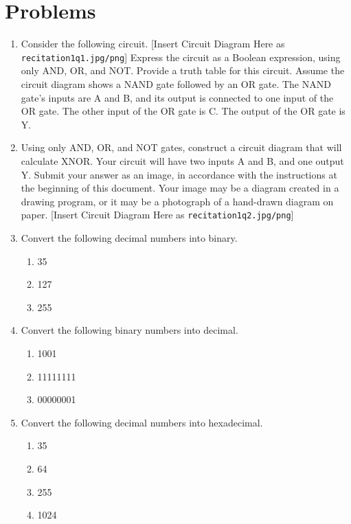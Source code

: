 \documentclass{article}
\begin{document}
\section*{Problems}
\begin{enumerate}
    \item Consider the following circuit.  [Insert Circuit Diagram Here as \texttt{recitation1q1.jpg/png}] Express the circuit as a Boolean expression, using only AND, OR, and NOT. Provide a truth table for this circuit.  Assume the circuit diagram shows a NAND gate followed by an OR gate. The NAND gate's inputs are A and B, and its output is connected to one input of the OR gate. The other input of the OR gate is C. The output of the OR gate is Y.

    \item Using only AND, OR, and NOT gates, construct a circuit diagram that will calculate XNOR. Your circuit will have two inputs A and B, and one output Y. Submit your answer as an image, in accordance with the instructions at the beginning of this document. Your image may be a diagram created in a drawing program, or it may be a photograph of a hand-drawn diagram on paper. [Insert Circuit Diagram Here as \texttt{recitation1q2.jpg/png}]

    \item Convert the following decimal numbers into binary.
    \begin{enumerate}
        \item 35
        \item 127
        \item 255
    \end{enumerate}

    \item Convert the following binary numbers into decimal.
    \begin{enumerate}
        \item 1001
        \item 11111111
        \item 00000001
    \end{enumerate}

    \item Convert the following decimal numbers into hexadecimal.
    \begin{enumerate}
        \item 35
        \item 64
        \item 255
        \item 1024
    \end{enumerate}


\end{enumerate}
\end{document}
